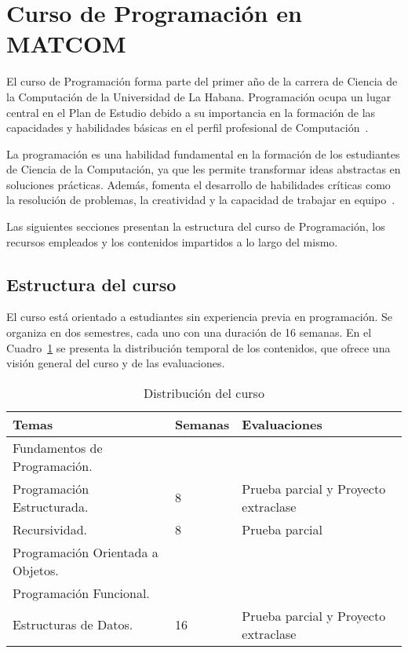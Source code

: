\section{Curso de Programación en \mbox{MATCOM}}\label{sec:matcom}

El curso de Programación forma parte del primer año de la carrera de Ciencia de la Computación de la Universidad de La Habana. Programación ocupa un lugar central en el Plan de Estudio debido a su importancia en la formación de las capacidades y habilidades básicas en el perfil profesional de Computación~\cite{plan_estudio_e_2017}.

La programación es una habilidad fundamental en la formación de los estudiantes de Ciencia de la Computación, ya que les permite transformar ideas abstractas en soluciones prácticas. Además, fomenta el desarrollo de habilidades críticas como la resolución de problemas, la creatividad y la capacidad de trabajar en equipo~\cite{plan_estudio_e_2017}.

Las siguientes secciones presentan la estructura del curso de Programación, los recursos empleados y los contenidos impartidos a lo largo del mismo.

\subsection{Estructura del curso}

El curso está orientado a estudiantes sin experiencia previa en programación. Se organiza en dos semestres, cada uno con una duración de 16 semanas. En el Cuadro~\ref{tab:course_distribution} se presenta la distribución temporal de los contenidos, que ofrece una visión general del curso y de las evaluaciones.

\begin{table}[h!]
    \centering
    \begin{tabular}{|p{6.5cm}|p{2cm}|p{3.5cm}|}
    \hline
    \textbf{Temas} & \textbf{Semanas} & \textbf{Evaluaciones} \\ \hline
    \raggedright Fundamentos de Programación. \\ Programación Estructurada. 
    & 8 & Prueba parcial y Proyecto extraclase \\ \hline
    \raggedright Recursividad.
    & 8 & Prueba parcial \\ \hline
    \raggedright Programación Orientada a Objetos. \\ Programación Funcional. \\ Estructuras de Datos. 
    & 16 & Prueba parcial y Proyecto extraclase \\ \hline
    \end{tabular}
    \caption{Distribución del curso}\label{tab:course_distribution}
\end{table}
    

